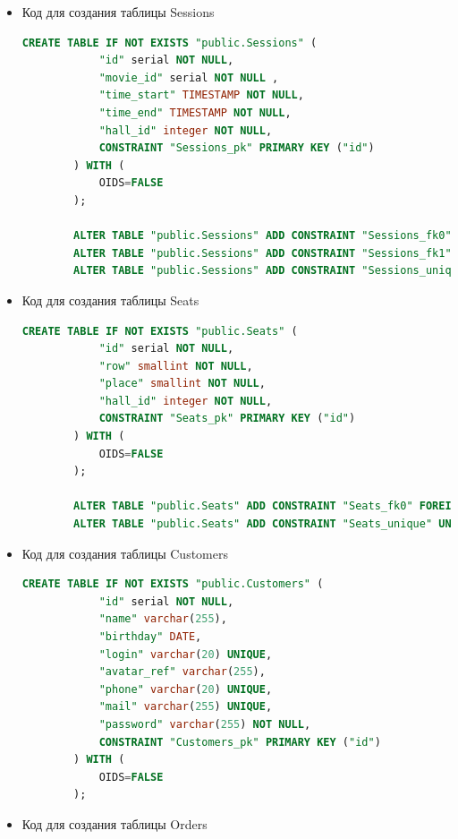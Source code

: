\documentclass[a4paper,12pt]{article}
\renewcommand{\^}[2]{#1^{\, #2} \kern -1pt}
\newcommand{\1}{\kern 1pt}
\newcommand{\0}{\kern -1pt}
\begin{document}
\begin{itemize}
	\item Код для создания таблицы Sessions

	\begin{lstlisting}[style=vscode-dark, language=SQL, label={code:sql}]
		CREATE TABLE IF NOT EXISTS "public.Sessions" (
			"id" serial NOT NULL,
			"movie_id" serial NOT NULL ,
			"time_start" TIMESTAMP NOT NULL,
			"time_end" TIMESTAMP NOT NULL,
			"hall_id" integer NOT NULL,
			CONSTRAINT "Sessions_pk" PRIMARY KEY ("id")
		) WITH (
			OIDS=FALSE
		);
		
		ALTER TABLE "public.Sessions" ADD CONSTRAINT "Sessions_fk0" FOREIGN KEY ("movie_id") REFERENCES "public.Movies"("id");
		ALTER TABLE "public.Sessions" ADD CONSTRAINT "Sessions_fk1" FOREIGN KEY ("hall_id") REFERENCES "public.Halls"("id");
		ALTER TABLE "public.Sessions" ADD CONSTRAINT "Sessions_unique" UNIQUE("hall_id", "time_start");
	\end{lstlisting}
	
	\item Код для создания таблицы Seats
	
	\begin{lstlisting}[style=vscode-dark, language=SQL, label={code:sql}]
		CREATE TABLE IF NOT EXISTS "public.Seats" (
			"id" serial NOT NULL,
			"row" smallint NOT NULL,
			"place" smallint NOT NULL,
			"hall_id" integer NOT NULL,
			CONSTRAINT "Seats_pk" PRIMARY KEY ("id")
		) WITH (
			OIDS=FALSE
		);
		
		ALTER TABLE "public.Seats" ADD CONSTRAINT "Seats_fk0" FOREIGN KEY ("hall_id") REFERENCES "public.Halls"("id");
		ALTER TABLE "public.Seats" ADD CONSTRAINT "Seats_unique" UNIQUE("row", "place", "hall_id");
	\end{lstlisting}

	\item Код для создания таблицы Customers

	\begin{lstlisting}[style=vscode-dark, language=SQL, label={code:sql}]
		CREATE TABLE IF NOT EXISTS "public.Customers" (
			"id" serial NOT NULL,
			"name" varchar(255),
			"birthday" DATE,
			"login" varchar(20) UNIQUE,
			"avatar_ref" varchar(255),
			"phone" varchar(20) UNIQUE,
			"mail" varchar(255) UNIQUE,
			"password" varchar(255) NOT NULL,
			CONSTRAINT "Customers_pk" PRIMARY KEY ("id")
		) WITH (
			OIDS=FALSE
		);
	\end{lstlisting}

	\item Код для создания таблицы Orders


\end{itemize}
\end{document}
